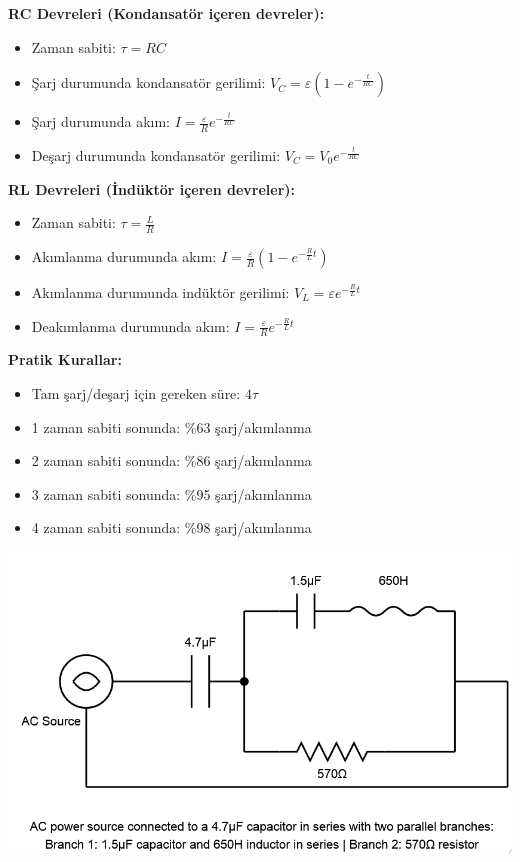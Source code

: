\documentclass[11pt,letterpaper,twocolumn]{fenbil}
\begin{document}
\begin{tcolorbox}
\textbf{RC Devreleri (Kondansatör içeren devreler):}
\begin{itemize}
\item Zaman sabiti: $\tau = RC$
\item Şarj durumunda kondansatör gerilimi: $V_C = \varepsilon(1 - e^{-\frac{t}{RC}})$
\item Şarj durumunda akım: $I = \frac{\varepsilon}{R}e^{-\frac{t}{RC}}$
\item Deşarj durumunda kondansatör gerilimi: $V_C = V_0 e^{-\frac{t}{RC}}$
\end{itemize}

\textbf{RL Devreleri (İndüktör içeren devreler):}
\begin{itemize}
\item Zaman sabiti: $\tau = \frac{L}{R}$
\item Akımlanma durumunda akım: $I = \frac{\varepsilon}{R}(1 - e^{-\frac{R}{L}t})$
\item Akımlanma durumunda indüktör gerilimi: $V_L = \varepsilon e^{-\frac{R}{L}t}$
\item Deakımlanma durumunda akım: $I = \frac{\varepsilon}{R}e^{-\frac{R}{L}t}$
\end{itemize}

\textbf{Pratik Kurallar:}
\begin{itemize}
\item Tam şarj/deşarj için gereken süre: $4\tau$
\item 1 zaman sabiti sonunda: \%63 şarj/akımlanma
\item 2 zaman sabiti sonunda: \%86 şarj/akımlanma
\item 3 zaman sabiti sonunda: \%95 şarj/akımlanma
\item 4 zaman sabiti sonunda: \%98 şarj/akımlanma
\end{itemize}
\end{tcolorbox}


\includegraphics[width=15cm]{Screenshot 2025-03-24 at 01-04-59 Claude.png}
\end{document}
